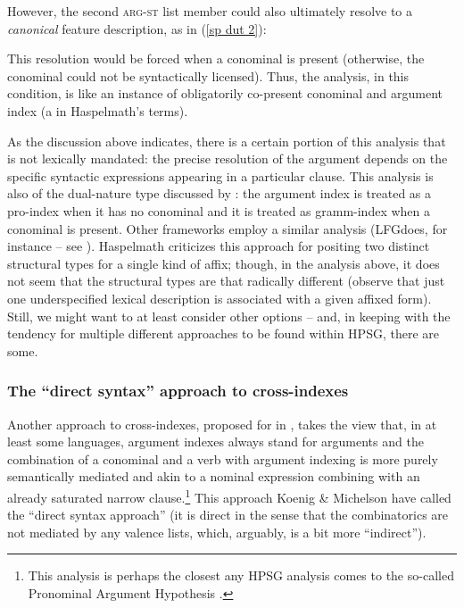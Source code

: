 \documentclass[output=paper,biblatex,babelshorthands,newtxmath,draftmode,colorlinks,citecolor=brown]{langscibook}
\begin{document}
However, the second \textsc{arg-st} list member could also ultimately resolve to a \textit{canonical} feature description, as in (\ref{sp dut 2}):   
%
%
\begin{exe}
\ex\label{sp dut 2}
\end{exe}
%
This resolution would be forced when a conominal is present (otherwise, the conominal could not be syntactically licensed). Thus, the analysis, in this condition, is like an instance of obligatorily co-present conominal and argument index (a  in Haspelmath's terms). 

As the discussion above indicates, there is a certain portion of this analysis that is not lexically mandated: the precise resolution of the argument depends on the specific syntactic expressions appearing in a particular clause. This analysis is also of the dual-nature type discussed by \citet{haspelmath13}: the argument index is treated as a pro-index when it has no conominal and it is treated as gramm-index when a conominal is present. Other frameworks employ a similar analysis (LFG\indexlfg does, for instance -- see \citealt[Chapter~8]{BATW2015a}). Haspelmath criticizes this approach for positing two distinct structural types for a single kind of affix; though, in the analysis above, it does not seem that the structural types are that radically different (observe that just one underspecified lexical description is associated with a given affixed form). Still, we might want to at least consider other options -- and, in keeping with the tendency for multiple different approaches to be found within HPSG, there are some.  

\subsubsection{The ``direct syntax'' approach to cross-indexes}

Another approach to cross-indexes, proposed for  in \citet{KM15}, takes the view that, in at least some languages, argument indexes always stand for arguments and the combination of a conominal and a verb with argument indexing is more purely semantically mediated and akin to a nominal expression combining with an already saturated narrow clause.\footnote{This analysis is perhaps the closest any HPSG analysis comes to the so-called Pronominal Argument Hypothesis \citep{jelinek84}.} This approach Koenig \& Michelson have called the ``direct syntax approach'' (it is direct in the sense that the combinatorics are not mediated by any valence lists, which, arguably, is a bit more ``indirect''). 
\end{document}
